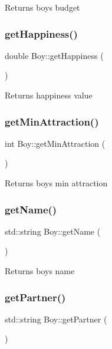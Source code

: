 Returns boy\textquotesingle{}s budget \mbox{\label{class_boy_a7ab7e61631b30e7f679ba204f3b2616d}} 
\subsubsection{\texorpdfstring{get\+Happiness()}{getHappiness()}}
{\footnotesize\ttfamily double Boy\+::get\+Happiness (\begin{DoxyParamCaption}{ }\end{DoxyParamCaption})}

Returns happiness value \mbox{\label{class_boy_a35d84533352a88f6365a28ba21b9f993}} 
\subsubsection{\texorpdfstring{get\+Min\+Attraction()}{getMinAttraction()}}
{\footnotesize\ttfamily int Boy\+::get\+Min\+Attraction (\begin{DoxyParamCaption}{ }\end{DoxyParamCaption})}

Returns boy\textquotesingle{}s min attraction \mbox{\label{class_boy_acf59fd0074a6ea3413751a95b2970303}} 
\subsubsection{\texorpdfstring{get\+Name()}{getName()}}
{\footnotesize\ttfamily std\+::string Boy\+::get\+Name (\begin{DoxyParamCaption}{ }\end{DoxyParamCaption})}

Returns boy\textquotesingle{}s name \mbox{\label{class_boy_ae7faa071153b463f2a7424650b1f6db3}} 
\subsubsection{\texorpdfstring{get\+Partner()}{getPartner()}}
{\footnotesize\ttfamily std\+::string Boy\+::get\+Partner (\begin{DoxyParamCaption}{ }\end{DoxyParamCaption})}

